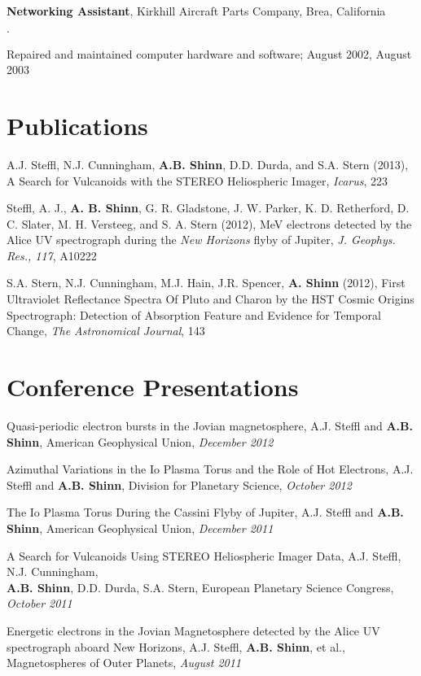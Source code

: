 \documentclass[margin,line]{res}
\newenvironment{list2}{
  \begin{list}{$\cdot$}{%
      \setlength{\itemsep}{0in}
      \setlength{\parsep}{0in} \setlength{\parskip}{0in}
      \setlength{\topsep}{0in} \setlength{\partopsep}{0in} 
      \setlength{\leftmargin}{0.2in}}}{\end{list}}
\begin{document}
\begin{resume}
{\bf Networking Assistant}, Kirkhill Aircraft Parts Company, Brea, California
\begin{list2}
\item Repaired and maintained computer hardware and software; August 2002, August 2003
\end{list2}


\section{\sc Publications}

A.J. Steffl, N.J. Cunningham, {\bf A.B. Shinn}, D.D. Durda, and S.A. Stern (2013), A Search for Vulcanoids with the STEREO Heliospheric Imager, {\em Icarus}, 223

Steffl, A. J., {\bf A. B. Shinn}, G. R. Gladstone, J. W. Parker, K. D. Retherford, D. C. Slater, M. H. Versteeg, and S. A. Stern (2012), MeV electrons detected by the Alice UV spectrograph during the {\em New Horizons} flyby of Jupiter, {\em J. Geophys. Res., 117}, A10222%

S.A. Stern, N.J. Cunningham, M.J. Hain, J.R. Spencer, {\bf A. Shinn} (2012), First Ultraviolet Reflectance Spectra Of Pluto and Charon by the HST Cosmic Origins Spectrograph: Detection of Absorption Feature and Evidence for Temporal Change, {\em The Astronomical Journal}, 143


\section{\sc Conference Presentations}

Quasi-periodic electron bursts in the Jovian magnetosphere, A.J. Steffl and {\bf A.B. Shinn}, American Geophysical Union, {\it December 2012}

Azimuthal Variations in the Io Plasma Torus and the Role of Hot Electrons, A.J. Steffl and {\bf A.B. Shinn}, Division for Planetary Science, {\it October 2012}

The Io Plasma Torus During the Cassini Flyby of Jupiter, A.J. Steffl and {\bf A.B. Shinn}, American Geophysical Union, {\it December 2011}

A Search for Vulcanoids Using STEREO Heliospheric Imager Data, A.J. Steffl, N.J. Cunningham, \\
{\bf A.B. Shinn}, D.D. Durda, S.A. Stern, European Planetary Science Congress, {\it October 2011}

Energetic electrons in the Jovian Magnetosphere detected by the Alice UV spectrograph aboard New Horizons, A.J. Steffl, {\bf A.B. Shinn}, et al., Magnetospheres of Outer Planets, {\it August 2011}


\end{resume}
\end{document}
